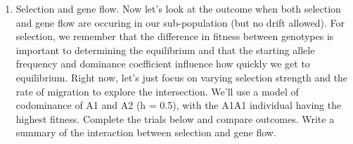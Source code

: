 \begin{enumerate}
  0.1

  1-10

  1

  1

  1

  0.6

  0.1

  high migration, large N

  2d

  50

  0.1

  1-10

  1

  1

  1

  0.6

  0

  no migration, small N

  2e

  50

  0.1

  1-10

  1

  1

  1

  0.6

  0.035

  low migration, small N

  2f

  50

  0.1

  1-10

  1

  1

  1

  0.6

  0.1

  high migration, small N
\item
  Selection and gene flow. Now let's look at the outcome when both
  selection and gene flow are occuring in our sub-population (but no
  drift allowed). For selection, we remember that the difference in
  fitness between genotypes is important to determining the equilibrium
  and that the starting allele frequency and dominance coefficient
  influence how quickly we get to equilibrium. Right now, let's just
  focus on varying selection strength and the rate of migration to
  explore the intersection. We'll use a model of codominance of A1 and
  A2 (h = 0.5), with the A1A1 individual having the highest fitness.
  Complete the trials below and compare outcomes. Write a summary of the
  interaction between selection and gene flow.


\end{enumerate}
